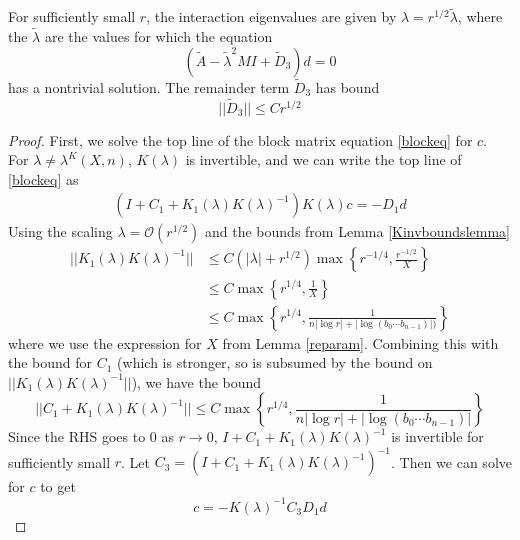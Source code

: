 \documentclass[thesis.tex]{subfiles}
\begin{document}
\begin{lemma}\label{deqlemma}
For sufficiently small $r$, the interaction eigenvalues are given by $\lambda = r^{1/2} \tilde{\lambda}$, where the $\tilde{\lambda}$ are the values for which the equation
\begin{equation}\label{eqford}
(\tilde{A} - \tilde{\lambda}^2 MI + \tilde{D}_3)d = 0
\end{equation}
has a nontrivial solution. The remainder term $\tilde{D}_3$ has bound
\begin{equation}\label{tildeD3bound}
||\tilde{D}_3|| \leq C r^{1/2}
\end{equation}

\begin{proof}
First, we solve the top line of the block matrix equation \eqref{blockeq} for $c$. For $\lambda \neq \lambda^K(X, n)$, $K(\lambda)$ is invertible, and we can write the top line of \eqref{blockeq} as
\begin{align*}
(I + C_1 + K_1(\lambda)K(\lambda)^{-1}) K(\lambda) c = -D_1 d
\end{align*}
Using the scaling $\lambda = \mathcal{O}(r^{1/2})$ and the bounds from Lemma \ref{Kinvboundslemma}
\begin{align*}
||K_1(\lambda)K(\lambda)^{-1}|| &\leq C (|\lambda| + r^{1/2})\max \left\{ r^{-1/4}, \frac{r^{-1/2}}{X} \right\} \\
&\leq C \max \left\{ r^{1/4}, \frac{1}{X} \right\} \\
&\leq C \max \left\{ r^{1/4}, \frac{1}{n |\log r| + |\log (b_0 \cdots b_{n-1})| ) } \right\}
\end{align*}
where we use the expression for $X$ from Lemma \ref{reparam}. Combining this with the bound for $C_1$ (which is stronger, so is subsumed by the bound on $||K_1(\lambda)K(\lambda)^{-1}||$), we have the bound
\[
||C_1 + K_1(\lambda)K(\lambda)^{-1}|| \leq C \max \left\{ r^{1/4}, \frac{1}{n |\log r| + |\log (b_0 \cdots b_{n-1})| } \right\}
\]
Since the RHS goes to 0 as $r \rightarrow 0$, $I + C_1 + K_1(\lambda)K(\lambda)^{-1}$ is invertible for sufficiently small $r$. Let $C_3 = (I + C_1 + K_1(\lambda)K(\lambda)^{-1})^{-1}$. Then we can solve for $c$ to get
\[
c = -K(\lambda)^{-1} C_3 D_1 d
\]


\end{proof}
\end{lemma}
\end{document}
